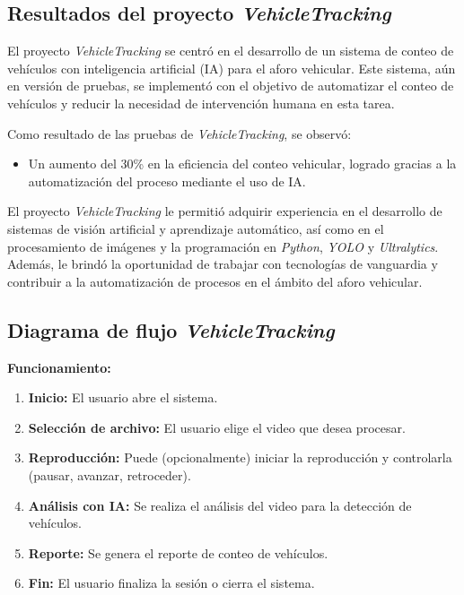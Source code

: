 \documentclass[protocolo.tex]{subfiles}
\begin{document}
\subsection{Resultados del proyecto \textit{VehicleTracking}}

El proyecto  \textit{VehicleTracking} se centró en el desarrollo de un sistema de conteo de vehículos con inteligencia artificial (IA) para el aforo vehicular.  Este sistema, aún en versión de pruebas, se implementó con el objetivo de automatizar el conteo de vehículos y reducir la necesidad de intervención humana en esta tarea.\vspace{4mm}

Como resultado de las pruebas de \textit{VehicleTracking}, se observó:

\begin{itemize}
\item Un aumento del 30\% en la eficiencia del conteo vehicular,  logrado gracias a la automatización del proceso mediante el uso de IA.
\end{itemize}

El proyecto \textit{VehicleTracking} le permitió adquirir experiencia en el desarrollo de sistemas de visión artificial y aprendizaje automático, así como en el procesamiento de imágenes y la programación en  \textit{Python},  \textit{YOLO} y  \textit{Ultralytics}.  Además, le brindó la oportunidad de trabajar con tecnologías de vanguardia y contribuir a la automatización de procesos en el ámbito del aforo vehicular.

\subsection{Diagrama de flujo \textit{VehicleTracking}} 
\textbf{Funcionamiento:}
\begin{enumerate}
    \item \textbf{Inicio:}  
    El usuario abre el sistema.
    \item \textbf{Selección de archivo:}  
    El usuario elige el video que desea procesar.
    \item \textbf{Reproducción:}  
    Puede (opcionalmente) iniciar la reproducción y controlarla (pausar, avanzar, retroceder).
    \item \textbf{Análisis con IA:}
    Se realiza el análisis del video para la detección de vehículos.
    \item \textbf{Reporte:}
    Se genera el reporte de conteo de vehículos.
    \item \textbf{Fin:}      
    El usuario finaliza la sesión o cierra el sistema.
\end{enumerate}
\end{document}
